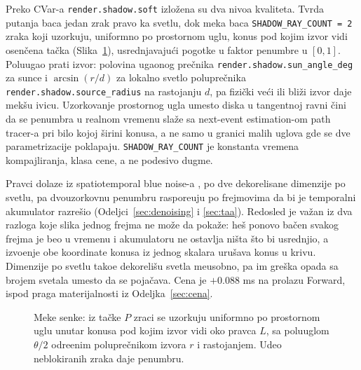Preko CVar-a \texttt{render.shadow.soft} izlo\v{z}ena su dva nivoa kvaliteta. Tvrda putanja baca jedan zrak pravo ka svetlu, dok meka baca \texttt{SHADOW_RAY_COUNT = 2} zraka koji uzorkuju, uniformno po prostornom uglu, konus pod kojim izvor vidi osen\v{c}ena ta\v{c}ka (Slika~\ref{fig:shadow}), usrednjavaju\'ci pogotke u faktor penumbre u $[0,1]$. Poluugao prati izvor: polovina ugaonog pre\v{c}nika \texttt{render.shadow.sun\_angle\_deg} za sunce i $\arcsin(r/d)$ za lokalno svetlo polupre\v{c}nika \texttt{render.shadow.source\_radius} na rastojanju $d$, pa fizi\v{c}ki ve\'ci ili bli\v{z}i izvor daje mek\v{s}u ivicu. Uzorkovanje prostornog ugla umesto diska u tangentnoj ravni \v{c}ini da se penumbra u realnom vremenu sla\v{z}e sa next-event estimation-om path tracer-a pri bilo kojoj \v{s}irini konusa, a ne samo u granici malih uglova gde se dve parametrizacije poklapaju. \texttt{SHADOW_RAY_COUNT} je konstanta vremena kompajliranja, klasa cene, a ne podesivo dugme.

Pravci dolaze iz spatiotemporal blue noise-a \cite{wolfe2022stbn}, po dve dekorelisane dimenzije po svetlu, pa dvouzorkovnu penumbru raspore\dj{}uju po frejmovima da bi je temporalni akumulator razre\v{s}io (Odeljci~\ref{sec:denoising} i \ref{sec:taa}). Redosled je va\v{z}an iz dva razloga koje slika jednog frejma ne mo\v{z}e da poka\v{z}e: he\v{s} ponovo ba\v{c}en svakog frejma je beo u vremenu i akumulatoru ne ostavlja ni\v{s}ta \v{s}to bi usrednjio, a izvo\dj{}enje obe koordinate konusa iz jednog skalara uru\v{s}ava konus u krivu. Dimenzije po svetlu tako\dj{}e dekoreli\v{s}u svetla me\dj{}usobno, pa im gre\v{s}ka opada sa brojem svetala umesto da se poja\v{c}ava. Cena je \(+0.088\) ms na prolazu Forward, ispod praga materijalnosti iz Odeljka~\ref{sec:cena}.

\begin{figure}[tbp]
\centering
{}
\caption[Uzorkovanje konusa meke senke]{Meke senke: iz ta\v{c}ke $P$ zraci se uzorkuju uniformno po prostornom uglu unutar konusa pod kojim izvor vidi oko pravca $L$, sa poluuglom $\theta/2$ odre\dj{}enim polupre\v{c}nikom izvora $r$ i rastojanjem. Udeo neblokiranih zraka daje penumbru.}
\label{fig:shadow}
\end{figure}

